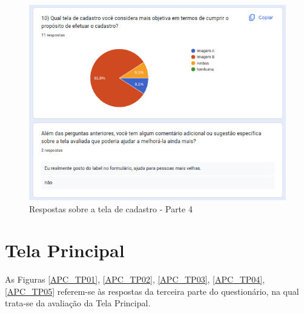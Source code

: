 \begin{figure}[!h]
	\begin{center}
	    \includegraphics[scale=0.7]{figs/Answers/Professionals/11.png}
	\end{center}
	\caption{\label{APC_TC04}Respostas sobre a tela de cadastro - Parte 4}
\end{figure}

\newpage

\section{Tela Principal}

As Figuras \ref{APC_TP01}, \ref{APC_TP02}, \ref{APC_TP03}, \ref{APC_TP04}, \ref{APC_TP05} referem-se às respostas da terceira parte do questionário, na qual trata-se da avaliação da Tela Principal.

